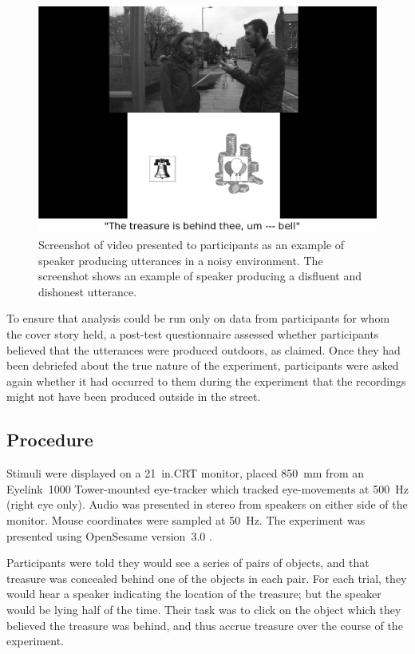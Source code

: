 \documentclass[a4paper,man,natbib]{apa6}
\begin{document}
\begin{figure}[Ht]
  \centering
	\includegraphics[scale=.2]{convincer.png}
  \caption{Screenshot of video presented to participants as an example of speaker producing utterances in a noisy environment. The screenshot shows an example of speaker producing a disfluent and dishonest utterance.}
  \label{fig:vid}
\end{figure}


To ensure that analysis could be run only on data from participants for whom the cover story held, a post-test questionnaire assessed whether participants believed that the utterances were produced outdoors, as claimed.
Once they had been debriefed about the true nature of the experiment, participants were asked again whether it had occurred to them during the experiment that the recordings might not have been produced outside in the street.

\subsection{Procedure}
Stimuli were displayed on a 21~in.\@ CRT monitor, placed 850~mm from an Eyelink~1000 Tower-mounted eye-tracker which tracked eye-movements at 500~Hz (right eye only). 
Audio was presented in stereo from speakers on either side of the monitor. 
Mouse coordinates were sampled at 50~Hz. 
The experiment was presented using OpenSesame version~3.0 \citep{Mathot2012}.


Participants were told they would see a series of pairs of objects, and that treasure was concealed behind one of the objects in each pair.
For each trial, they would hear a speaker indicating the location of the treasure; but the speaker would be lying half of the time.
Their task was to click on the object which they believed the treasure was behind, and thus accrue treasure over the course of the experiment.
\end{document}
